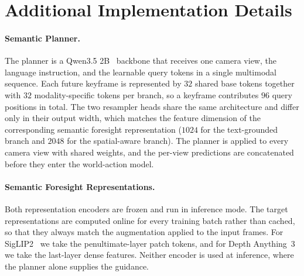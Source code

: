 
\section{Additional Implementation Details}
\label{sec:appendix_impl}

\paragraph{Semantic Planner.}
The planner is a Qwen3.5 2B~\cite{qwen35} backbone that receives one camera view, the language
instruction, and the learnable query tokens in a single multimodal sequence.
Each future keyframe is represented by $32$ shared base tokens together with $32$ modality-specific tokens per branch, so a keyframe contributes $96$ query positions in total.
The two resampler heads share the same architecture and differ only in their output width, which matches the feature dimension of the corresponding
semantic foresight representation ($1024$ for the text-grounded branch and
$2048$ for the spatial-aware branch).
The planner is applied to every camera view with shared weights, and the per-view predictions are concatenated before they enter the world-action model.

\paragraph{Semantic Foresight Representations.}
Both representation encoders are frozen and run in inference mode.
The target representations are computed online for every training batch rather
than cached, so that they always match the augmentation applied to the input
frames.
For SigLIP2~\cite{siglip2} we take the penultimate-layer patch tokens, and for
Depth Anything~3~\cite{lin2025depth} we take the last-layer dense features.
Neither encoder is used at inference, where the planner alone supplies the
guidance.

